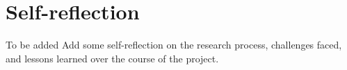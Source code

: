 \chapter{Self-reflection}
\label{chap:self-reflection}

\begin{custombox}[orange]{To be added}
    Add some self-reflection on the research process, challenges faced, and lessons learned over the course of the project.
\end{custombox}